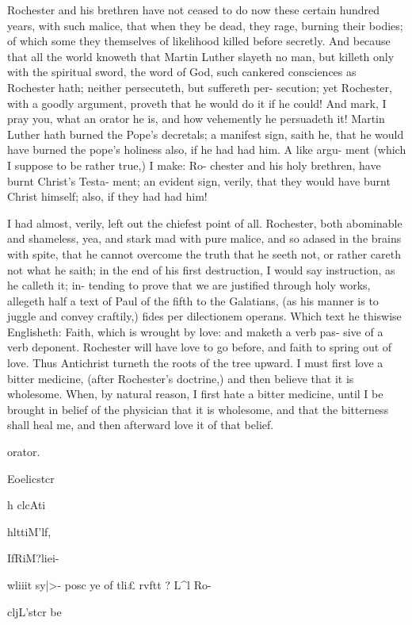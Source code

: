 \documentclass{custom}
\begin{document}
{Rochester and his brethren have not ceased to do now 
these certain hundred years, with such malice, that when 
they be dead, they rage, burning their bodies; of which 
some they themselves of likelihood killed before secretly. 
And because that all the world knoweth that Martin 
Luther slayeth no man, but killeth only with the spiritual 
sword, the word of God, such cankered consciences as 
Rochester hath; neither persecuteth, but suffereth per- 
secution; yet Rochester, with a goodly argument, proveth 
that he would do it if he could! And mark, I pray you, 
what an orator he is, and how vehemently he persuadeth 
it! Martin Luther hath burned the Pope's decretals; a 
manifest sign, saith he, that he would have burned the 
pope's holiness also, if he had had him. A like argu- 
ment (which I suppose to be rather true,) I make: Ro- 
chester and his holy brethren, have burnt Christ's Testa- 
ment; an evident sign, verily, that they would have burnt 
Christ himself; also, if they had had him! 

I had almost, verily, left out the chiefest point of all. 
Rochester, both abominable and shameless, yea, and stark 
mad with pure malice, and so adased in the brains with 
spite, that he cannot overcome the truth that he seeth not, 
or rather careth not what he saith; in the end of his first 
destruction, I would say instruction, as he calleth it; in- 
tending to prove that we are justified through holy works, 
allegeth half a text of Paul of the fifth to the Galatians, 
(as his manner is to juggle and convey craftily,) fides per 
dilectionem operans. Which text he thiswise Englisheth: 
Faith, which is wrought by love: and maketh a verb pas- 
sive of a verb deponent. Rochester will have love to go 
before, and faith to spring out of love. Thus Antichrist 
turneth the roots of the tree upward. I must first love a 
bitter medicine, (after Rochester's doctrine,) and then 
believe that it is wholesome. When, by natural reason, I 
first hate a bitter medicine, until I be brought in belief of 
the physician that it is wholesome, and that the bitterness 
shall heal me, and then afterward love it of that belief. 

orator. 

Eoelicstcr 

h clcAti 

hlttiM'lf, 

IfRiM?liei- 

wliiit sy|>- 
posc ye of 
tli£ rvftt ? 
L^l Ro- 

cljL'stcr be 

}
\end{document}
